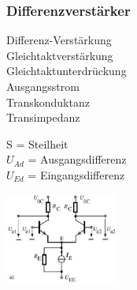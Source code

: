   \subsubsection{Differenzverst\"arker}
    \begin{minipage}[T]{11cm}
      Differenz-Verst\"arkung
      \hspace{8.4mm}\\
      Gleichtaktverst\"arkung
      \hspace{8.1mm}\\
      Gleichtaktunterdr\"uckung
      \hspace{3.8mm}\\
      Ausgangsstrom
      \hspace{18.8mm} \\
      Transkonduktanz
      \hspace{15.6mm} \\
      Transimpedanz
      \hspace{19mm}
    \end{minipage}
    \begin{minipage}[T]{4cm}
      S = Steilheit \\
      $U_{Ad}$ = Ausgangsdifferenz \\
      $U_{Ed}$ = Eingangsdifferenz \\
    \end{minipage}
    \begin{minipage}{4cm}
      \includegraphics[height=3cm]{./bilder/BipTraDiffAmp.png}
    \end{minipage}\\
             
